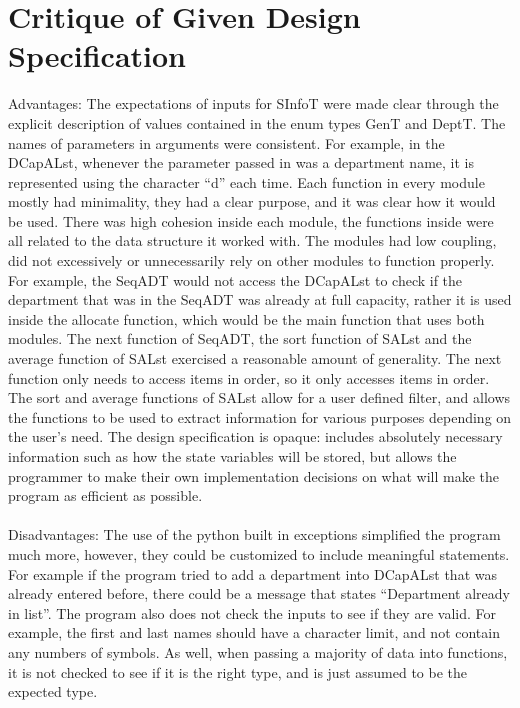 \documentclass[12pt]{article}
\begin{document}
\section{Critique of Given Design Specification}

Advantages: The expectations of inputs for SInfoT were made clear through the explicit description of values contained in the enum types GenT and DeptT. The names of parameters in arguments were consistent. For example, in the DCapALst, whenever the parameter passed in was a department name, it is represented using the character ``d'' each time.  Each function in every module mostly had minimality, they had a clear purpose, and it was clear how it would be used. There was high cohesion inside each module, the functions inside were all related to the data structure it worked with. The modules had low coupling, did not excessively or unnecessarily rely on other modules to function properly. For example, the SeqADT would not access the DCapALst to check if the department that was in the SeqADT was already at full capacity, rather it is used inside the allocate function, which would be the main function that uses both modules. The next function of SeqADT, the sort function of SALst and the average function of SALst exercised a reasonable amount of generality. The next function only needs to access items in order, so it only accesses items in order. The sort and average functions of SALst allow for a user defined filter, and allows the functions to be used to extract information for various purposes depending on the user's need. The design specification is opaque: includes absolutely necessary information such as how the state variables will be stored, but allows the programmer to make their own implementation decisions on what will make the program as efficient as possible.  \\ \\

Disadvantages: The use of the python built in exceptions simplified the program much more, however, they could be customized to include meaningful statements. For example if the program tried to add a department into DCapALst that was already entered before, there could be a message that states ``Department already in list''.  The program also does not check the inputs to see if they are valid. For example, the first and last names should have a character limit, and not contain any numbers of symbols. As well, when passing a majority of data into functions, it is not checked to see if it is the right type, and is just assumed to be the expected type.
\end{document}
